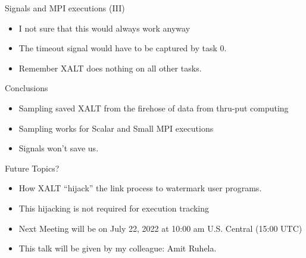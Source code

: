 \documentclass{beamer}
\begin{document}
\begin{frame}{Signals and MPI executions (III)}
  \begin{itemize}
    \item I not sure that this would always work anyway
    \item The timeout signal would have to be captured by task 0.
    \item Remember XALT does nothing on all other tasks.
  \end{itemize}
\end{frame}


\begin{frame}{Conclusions}
  \begin{itemize}
    \item Sampling saved XALT from the firehose of data from thru-put computing
    \item Sampling works for Scalar and Small MPI executions
    \item Signals won't save us.
  \end{itemize}
\end{frame}


\begin{frame}{Future Topics?}
  \begin{itemize}
    \item How XALT ``hijack'' the link process to watermark user
      programs.
    \item This hijacking is not required for execution tracking
    \item Next Meeting will be on July 22, 2022 at 10:00 am
      U.S. Central (15:00 UTC)
    \item This talk will be given by my colleague: Amit Ruhela.
  \end{itemize}
\end{frame}
%

%
\end{document}
